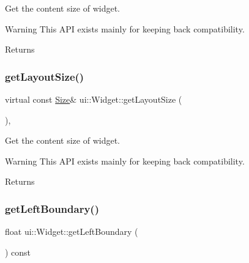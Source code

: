 Get the content size of widget. \begin{DoxyWarning}{Warning}
This A\+PI exists mainly for keeping back compatibility. 
\end{DoxyWarning}
\begin{DoxyReturn}{Returns}

\end{DoxyReturn}
\mbox{\label{classui_1_1Widget_a170d1942e94f24cc01aa7cb146b10dc8}} 
\subsubsection{\texorpdfstring{get\+Layout\+Size()}{getLayoutSize()}\hspace{0.1cm}{\footnotesize\ttfamily [2/2]}}
{\footnotesize\ttfamily virtual const \hyperlink{classSize}{Size}\& ui\+::\+Widget\+::get\+Layout\+Size (\begin{DoxyParamCaption}{ }\end{DoxyParamCaption})\hspace{0.3cm}{\ttfamily [inline]}, {\ttfamily [virtual]}}

Get the content size of widget. \begin{DoxyWarning}{Warning}
This A\+PI exists mainly for keeping back compatibility. 
\end{DoxyWarning}
\begin{DoxyReturn}{Returns}

\end{DoxyReturn}
\mbox{\label{classui_1_1Widget_a8385fe9b6ee78928d9c585e2faf0bc0d}} 
\subsubsection{\texorpdfstring{get\+Left\+Boundary()}{getLeftBoundary()}\hspace{0.1cm}{\footnotesize\ttfamily [1/2]}}
{\footnotesize\ttfamily float ui\+::\+Widget\+::get\+Left\+Boundary (\begin{DoxyParamCaption}{ }\end{DoxyParamCaption}) const}

